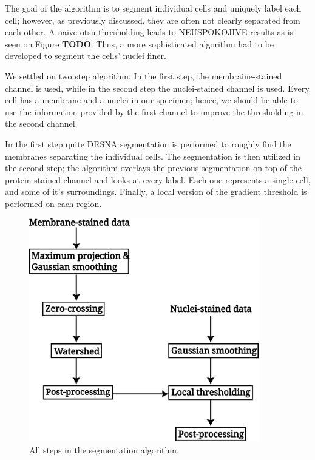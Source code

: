 \documentclass[
  digital,     %
  oneside,     %
  nosansbold,  %
  nocolorbold, %
  lof,         %
  lot,         %
]{fithesis4}
\begin{document}

The goal of the algorithm is to segment individual cells and uniquely label each
cell; however, as previously discussed, they are often not clearly separated
from each other. A naive otsu thresholding leads to NEUSPOKOJIVE results as is
seen on Figure \textbf{TODO}. Thus, a more sophisticated algorithm had to be
developed to segment the cells' nuclei finer.

We settled on two step algorithm. In the first step, the membraine-stained
channel is used, while in the second step the nuclei-stained channel is used.
Every cell has a membrane and a nuclei in our specimen; hence, we should be able
to use the information provided by the first channel to improve the thresholding
in the second channel.

In the first step quite DRSNA segmentation is performed to roughly find the
membranes separating the individual cells. The segmentation is then utilized in
the second step; the algorithm overlays the previous segmentation on top of the
protein-stained channel and looks at every label. Each one represents a single
cell, and some of it's surroundings. Finally, a local version of the gradient 
threshold is performed on each region.

\begin{figure}
    \begin{center}
        \includegraphics[width=10cm]{./resources/inkscape/segmentation-steps.png}
    \end{center}
    \caption{All steps in the segmentation algorithm.}
    \label{fig:segmentation_steps}
\end{figure}
\end{document}
